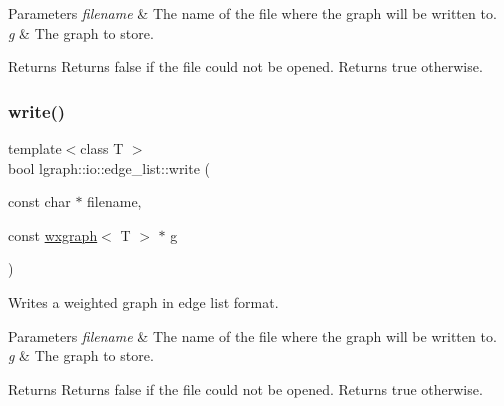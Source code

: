 \begin{DoxyParams}{Parameters}
{\em filename} & The name of the file where the graph will be written to. \\
\hline
{\em g} & The graph to store. \\
\hline
\end{DoxyParams}
\begin{DoxyReturn}{Returns}
Returns false if the file could not be opened. Returns true otherwise. 
\end{DoxyReturn}
\mbox{\label{namespacelgraph_1_1io_1_1edge__list_ab8a0f64a5850e4c9741fcb2fc53646b7}} 
\subsubsection{\texorpdfstring{write()}{write()}\hspace{0.1cm}{\footnotesize\ttfamily [4/4]}}
{\footnotesize\ttfamily template$<$class T $>$ \\
bool lgraph\+::io\+::edge\+\_\+list\+::write (\begin{DoxyParamCaption}\item[{const char $\ast$}]{filename,  }\item[{const \hyperlink{classlgraph_1_1wxgraph}{wxgraph}$<$ T $>$ $\ast$}]{g }\end{DoxyParamCaption})}



Writes a weighted graph in edge list format. 


\begin{DoxyParams}{Parameters}
{\em filename} & The name of the file where the graph will be written to. \\
\hline
{\em g} & The graph to store. \\
\hline
\end{DoxyParams}
\begin{DoxyReturn}{Returns}
Returns false if the file could not be opened. Returns true otherwise. 
\end{DoxyReturn}
